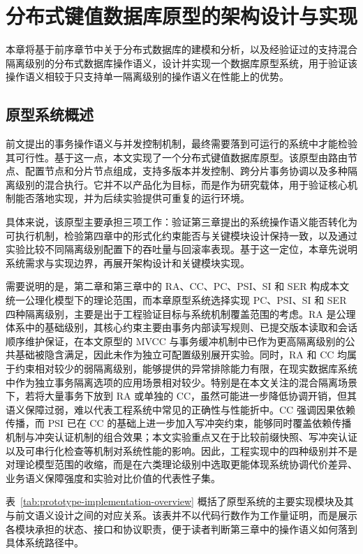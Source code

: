 \chapter{分布式键值数据库原型的架构设计与实现}
本章将基于前序章节中关于分布式数据库的建模和分析，以及经\TLAPlus 验证过的支持混合隔离级别的分布式数据库操作语义，设计并实现一个数据库原型系统，用于验证该操作语义相较于只支持单一隔离级别的操作语义在性能上的优势。

\section{原型系统概述}
前文提出的事务操作语义与并发控制机制，最终需要落到可运行的系统中才能检验其可行性。基于这一点，本文实现了一个分布式键值数据库原型。该原型由路由节点、配置节点和分片节点组成，支持多版本并发控制、跨分片事务协调以及多种隔离级别的混合执行。它并不以产品化为目标，而是作为研究载体，用于验证核心机制能否落地实现，并为后续实验提供可重复的运行环境。

具体来说，该原型主要承担三项工作：验证第三章提出的系统操作语义能否转化为可执行机制，检验第四章中的形式化约束能否与关键模块设计保持一致，以及通过实验比较不同隔离级别配置下的吞吐量与回滚率表现。基于这一定位，本章先说明系统需求与实现边界，再展开架构设计和关键模块实现。

需要说明的是，第二章和第三章中的 RA、CC、PC、PSI、SI 和 SER 构成本文统一公理化模型下的理论范围，而本章原型系统选择实现 PC、PSI、SI 和 SER 四种隔离级别，主要是出于工程验证目标与系统机制覆盖范围的考虑。RA 是公理体系中的基础级别，其核心约束主要由事务内部读写规则、已提交版本读取和会话顺序维护保证，在本文原型的 MVCC 与事务缓冲机制中已作为更高隔离级别的公共基础被隐含满足，因此未作为独立可配置级别展开实验。同时，RA 和 CC 均属于约束相对较少的弱隔离级别，能够提供的异常排除能力有限，在现实数据库系统中作为独立事务隔离选项的应用场景相对较少。特别是在本文关注的混合隔离场景下，若将大量事务下放到 RA 或单独的 CC，虽然可能进一步降低协调开销，但其语义保障过弱，难以代表工程系统中常见的正确性与性能折中。CC 强调因果依赖传播，而 PSI 已在 CC 的基础上进一步加入写冲突约束，能够同时覆盖依赖传播机制与冲突认证机制的组合效果；本文实验重点又在于比较前缀快照、写冲突认证以及可串行化检查等机制对系统性能的影响。因此，工程实现中的四种级别并不是对理论模型范围的收缩，而是在六类理论级别中选取更能体现系统协调代价差异、业务语义保障强度和实验对比价值的代表性子集。

表~\ref{tab:prototype-implementation-overview} 概括了原型系统的主要实现模块及其与前文语义设计之间的对应关系。该表并不以代码行数作为工作量证明，而是展示各模块承担的状态、接口和协议职责，便于读者判断第三章中的操作语义如何落到具体系统路径中。

